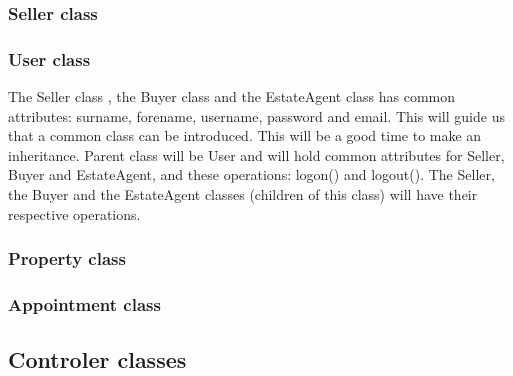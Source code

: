 \documentclass[a4paper,12pt]{article}
\begin{document}
\subsubsection{Seller class}

\subsubsection{User class}
The Seller class , the Buyer class and the EstateAgent class has common attributes: surname, forename, username, password and email.
This will guide us that a common class can be introduced.
This will be a good time to make an inheritance.
Parent class will be User and will hold common attributes for Seller, Buyer and EstateAgent, and these operations: logon() and logout().
The Seller, the Buyer and the EstateAgent classes (children of this class) will have their respective operations.

\subsubsection{Property class}

\subsubsection{Appointment class}

\subsection {Controler classes}
\end{document}
